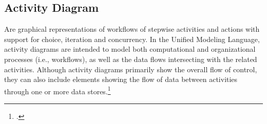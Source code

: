 







\clearpage
\subsection{Activity Diagram}
Are graphical representations of workflows of stepwise activities and actions with support for choice, iteration and concurrency. In the Unified Modeling Language, activity diagrams are intended to model both computational and organizational processes (i.e., workflows), as well as the data flows intersecting with the related activities. Although activity diagrams primarily show the overall flow of control, they can also include elements showing the flow of data between activities through one or more data stores.\footcite{wikiactivitydiagram}


